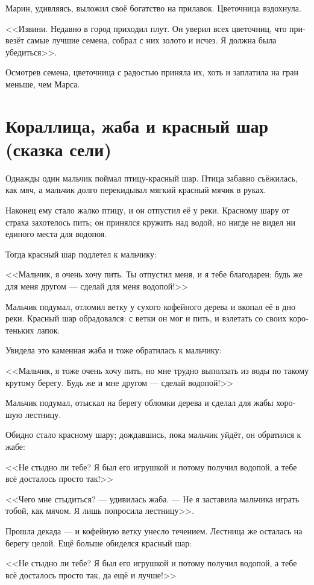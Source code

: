 \documentclass[a4paper,12pt,fleqn]{book}\usepackage{cooltooltips}\usepackage{polyglossia}\setdefaultlanguage[babelshorthands=true]{russian}\setotherlanguage{english}\defaultfontfeatures{Ligatures=TeX,Mapping=tex-text} \usepackage{xcolor}\definecolor{lightgray}{HTML}{bbbbbb}\color{lightgray}\newcommand{\ml}[3]{\textenglish{\textcolor{black}{#3}}}
\begin{document}
{Марин, удивляясь, выложил своё богатство на прилавок.
Цветочница вздохнула.

<<Извини.
Недавно в город приходил плут.
Он уверил всех цветочниц, что привезёт самые лучшие семена, собрал с них золото и исчез.
Я должна была убедиться>>.

Осмотрев семена, цветочница с радостью приняла их, хоть и заплатила на гран меньше, чем Марса.

\section{Кораллица, жаба и красный шар (сказка сели)}

Однажды один мальчик поймал птицу-красный шар.
Птица забавно съёжилась, как мяч, а мальчик долго перекидывал мягкий красный мячик в руках.

Наконец ему стало жалко птицу, и он отпустил её у реки.
Красному шару от страха захотелось пить;
он принялся кружить над водой, но нигде не видел ни единого места для водопоя.

Тогда красный шар подлетел к мальчику:

<<Мальчик, я очень хочу пить.
Ты отпустил меня, и я тебе благодарен;
будь же для меня другом --- сделай для меня водопой!>>

Мальчик подумал, отломил ветку у сухого кофейного дерева и вкопал её в дно реки.
Красный шар обрадовался: с ветки он мог и пить, и взлетать со своих коротеньких лапок.

Увидела это каменная жаба и тоже обратилась к мальчику:

<<Мальчик, я тоже очень хочу пить, но мне трудно выползать из воды по такому крутому берегу.
Будь же и мне другом --- сделай водопой!>>

Мальчик подумал, отыскал на берегу обломки дерева и сделал для жабы хорошую лестницу.

Обидно стало красному шару;
дождавшись, пока мальчик уйдёт, он обратился к жабе:

<<Не стыдно ли тебе?
Я был его игрушкой и потому получил водопой, а тебе всё досталось просто так!>>

<<Чего мне стыдиться? --- удивилась жаба.
--- Не я заставила мальчика играть тобой, как мячом.
Я лишь попросила лестницу>>.

Прошла декада --- и кофейную ветку унесло течением.
Лестница же осталась на берегу целой.
Ещё больше обиделся красный шар:

<<Не стыдно ли тебе?
Я был его игрушкой и потому получил водопой, а тебе всё досталось просто так, да ещё и лучше!>>

}
\end{document}
